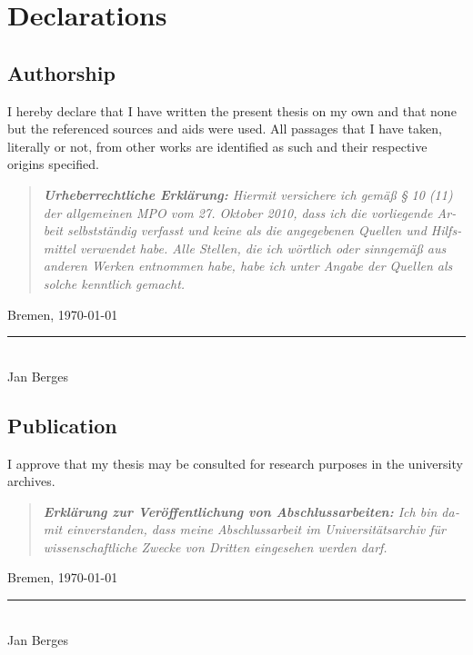 

\chapter{Declarations}

\section*{Authorship}

I hereby declare that I have written the present thesis on my own and that none
but the referenced sources and aids were used. All passages that I have taken,
literally or not, from other works are identified as such and their respective
origins specified.

\begin{otherlanguage}{ngerman}
    \begin{quote}
        \small \itshape
        \textbf{Urheberrechtliche Erklärung:}
        Hiermit versichere ich gemäß § 10 (11) der allgemeinen MPO vom 27.
        Oktober 2010, dass ich die vorliegende Arbeit selbstständig verfasst und
        keine als die angegebenen Quellen und Hilfsmittel verwendet habe.
        Alle Stellen, die ich wörtlich oder sinngemäß aus anderen Werken
        entnommen habe, habe ich unter Angabe der Quellen als solche kenntlich
        gemacht.
    \end{quote}
\end{otherlanguage}

Bremen, \today

\begin{flushright}
    \rule{3cm}{0.5pt} \\
    Jan Berges \\
\end{flushright}

\section*{Publication}

I approve that my thesis may be consulted for research purposes in the
university archives.

\begin{otherlanguage}{ngerman}
    \begin{quote}
        \small \itshape
        \textbf{Erklärung zur Veröffentlichung von Abschlussarbeiten:}
        Ich bin damit einverstanden, dass meine Abschlussarbeit im
        Universitätsarchiv für wissenschaftliche Zwecke von Dritten eingesehen
        werden darf.
    \end{quote}
\end{otherlanguage}

Bremen, \today

\begin{flushright}
    \rule{3cm}{0.5pt} \\
    Jan Berges
\end{flushright}
